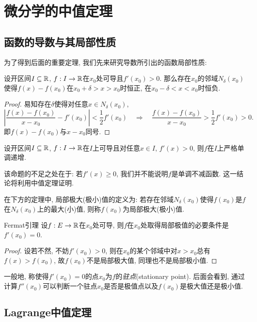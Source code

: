 \newpage
\section{微分学的中值定理}

\subsection{函数的导数与其局部性质}

为了得到后面的重要定理, 我们先来研究导数所引出的函数局部性质: 

\begin{lemma}{}
	设开区间$I \subseteq \mathbb{R}$, $f:I \to \mathbb{R}$在$x_0$处可导且$f'(x_0)>0$. 那么存在$x_0$的邻域$N_{\delta}(x_0)$使得$f(x)-f(x_0)$在$x_0+\delta>x>x_0$时恒正, 在$x_0-\delta<x<x_0$时恒负. 
\end{lemma}
\begin{proof}
	易知存在$\delta$使得对任意$x\in N_{\delta}(x_0)$, $$\left| \frac{f(x)-f(x_0)}{x-x_0}-f'(x_0) \right| < \frac{1}{2}f'(x_0) \quad \Rightarrow \quad \frac{f(x)-f(x_0)}{x-x_0} > \frac{1}{2}f'(x_0) >0.$$
	即$f(x)-f(x_0)$与$x-x_0$同号. 
\end{proof}

\begin{proposition}{}
	设开区间$I\subseteq \mathbb{R}$, $f:I \to \mathbb{R}$在$I$上可导且对任意$x \in I$, $f'(x)>0$, 则$f$在$I$上严格单调递增. 
\end{proposition}
\begin{remark}
	该命题的不足之处在于: 若$f'(x) \geq 0$, 我们并不能说明$f$是单调不减函数. 这一结论将利用中值定理证明. 
\end{remark}

在下方的定理中, 局部极大(极小)值的定义为: 若存在邻域$N_{\delta}(x_0)$使得$f(x_0)$是$f$在$N_{\delta}(x_0)$上的最大(小)值, 则称$f(x_0)$为局部极大(极小)值. 

\begin{lemma}{Fermat引理}
	设$f:E \to \mathbb{R}$在$x_0$处可导, 则$f$在$x_0$处取得局部极值的必要条件是$f'(x_0)=0$. 
\end{lemma}
\begin{proof}
	设若不然, 不妨$f'(x_0)>0$, 则在$x_0$的某个邻域中对$x>x_0$总有$f(x)>f(x_0)$, 故$f(x_0)$不是局部极大值, 同理也不是局部极小值. 
\end{proof}

一般地, 称使得$f'(x_0)=0$的点$x_0$为$f$的\textit{驻点}(stationary point). 后面会看到, 通过计算$f''(x_0)$可以判断一个驻点$x_0$是否是极值点以及$f(x_0)$是极大值还是极小值. 

\subsection{Lagrange中值定理}

